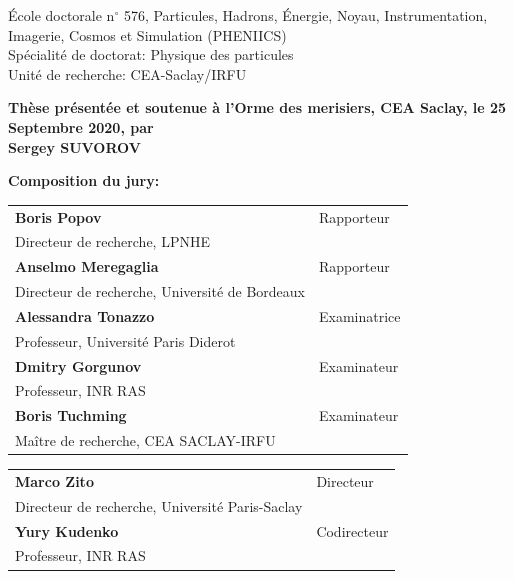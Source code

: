 \documentclass[../main.tex]{subfiles}
\begin{document}
\vspace{15mm}

École doctorale n$^{\circ}$ 576, Particules, Hadrons, Énergie, Noyau, Instrumentation,
Imagerie, Cosmos et Simulation (PHENIICS)\\
\small Spécialité de doctorat: Physique des particules\\
\footnotesize Unité de recherche: CEA-Saclay/IRFU\\
\vspace{15mm}

\textbf{Thèse présentée et soutenue à l'Orme des merisiers, CEA Saclay, le 25 Septembre 2020, par}\\
\bigskip
\Large {\color{Prune} \textbf{Sergey SUVOROV}}


\vspace{\fill} %

\flushleft \small \textbf{Composition du jury:}
\bigskip



\scriptsize
\begin{tabular}{|p{8cm}l}
\textbf{Boris Popov} &   Rapporteur\\
Directeur de recherche, LPNHE & \\
\textbf{Anselmo Meregaglia} &  Rapporteur \\
Directeur de recherche, Université de Bordeaux  &   \\

\textbf{Alessandra Tonazzo} &  Examinatrice \\
Professeur, Université Paris Diderot   &   \\
\textbf{Dmitry Gorgunov} &  Examinateur \\
Professeur, INR RAS   &   \\
\textbf{Boris Tuchming} &  Examinateur \\
Maître de recherche, CEA SACLAY-IRFU   &   \\

\end{tabular}

\medskip
\begin{tabular}{|p{8cm}l}\arrayrulecolor{white}
\textbf{Marco Zito} &   Directeur\\
Directeur de recherche, Université Paris-Saclay & \\
\textbf{Yury Kudenko} &   Codirecteur\\
Professeur, INR RAS  &   \\


\end{tabular}
\end{document}
